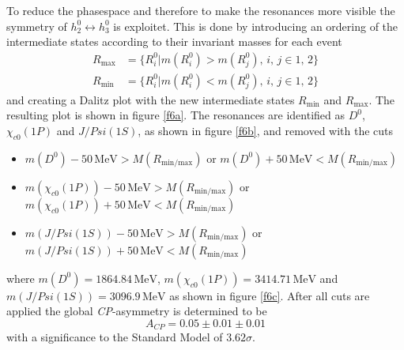 To reduce the phasespace and therefore to make the resonances more visible the symmetry of $h_2^0 \leftrightarrow h_3^0$ is 
exploitet. This is done by introducing an ordering of the intermediate states according to their invariant masses for each event
\begin{align*}
  R_\text{max} &= \{R_i^0 | m(R_i^0) > m(R_j^0) , \, i,\,j \in {1, \, 2}\} \\
  R_\text{min} &= \{R_i^0 | m(R_i^0) < m(R_j^0) , \, i,\,j \in {1, \, 2}\} 
\end{align*}
and creating a Dalitz plot with the new intermediate states $R_\text{min}$ and $R_\text{max}$. 
The resulting plot is shown in figure \ref{f6a}. The resonances are identified as $D^0$, $\chi_{c0}(1P)$ and $J/Psi(1S)$, as 
shown in figure \ref{f6b}, and removed with the cuts 
\begin{itemize}
  \item $m(D^0) - 50 \, \si{\mega\eV} > M(R_{\text{min/max}})$ or $m(D^0) + 50 \, \si{\mega\eV} < M(R_{\text{min/max}})$
  \item $m(\chi_{c0}(1P)) - 50 \, \si{\mega\eV} > M(R_{\text{min/max}})$ or $m(\chi_{c0}(1P)) + 50 \, \si{\mega\eV} < M(R_{\text{min/max}})$
  \item $m(J/Psi(1S)) - 50 \, \si{\mega\eV} > M(R_{\text{min/max}})$ or $m(J/Psi(1S)) + 50 \, \si{\mega\eV} < M(R_{\text{min/max}})$
\end{itemize}
where $m(D^0) = 1864.84 \, \si{\mega\eV}$, $m(\chi_{c0}(1P)) = 3414.71 \, \si{\mega\eV}$ and $m(J/Psi(1S)) = 3096.9  \, \si{\mega\eV}$ \cite{pdg} 
as shown in figure \ref{f6c}.
After all cuts are applied the global \textit{CP}-asymmetry is determined to be 
\begin{equation}
  A_\textit{CP} = 0.05  \pm  0.01 \pm 0.01
\end{equation}
with a significance to the Standard Model of $3.62 \sigma$.

